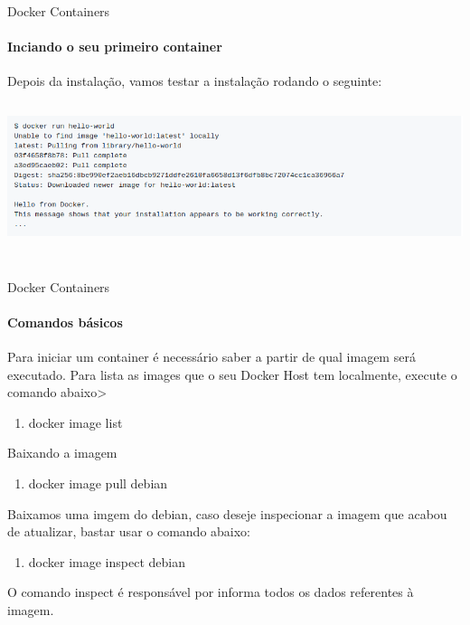 \documentclass{beamer}
\begin{document}
\begin{frame}{Docker Containers}
    \framesubtitle{Inciando o seu primeiro container}
    Depois da instala\c{c}\~ao, vamos testar a instala\c{c}\~ao rodando o seguinte:
    \includegraphics[height=5cm]{img/hello.png}
\end{frame}

\begin{frame}{Docker Containers}
    \framesubtitle{Comandos básicos}
    Para iniciar um container \'e necess\'ario saber a partir de qual imagem será executado. Para lista as
    images que o seu Docker Host tem localmente, execute o comando abaixo>
    \begin{enumerate}
        \item  docker image list
    \end{enumerate}
    Baixando a imagem
    \begin{enumerate}
        \item docker image pull debian
    \end{enumerate}
    Baixamos uma imgem do debian, caso deseje inspecionar a imagem que acabou de atualizar, bastar usar o comando abaixo:
    \begin{enumerate}
        \item docker image inspect debian
    \end{enumerate}
    O comando inspect \'e respons\'avel por informa todos os dados referentes \`a imagem.
\end{frame}
\end{document}
